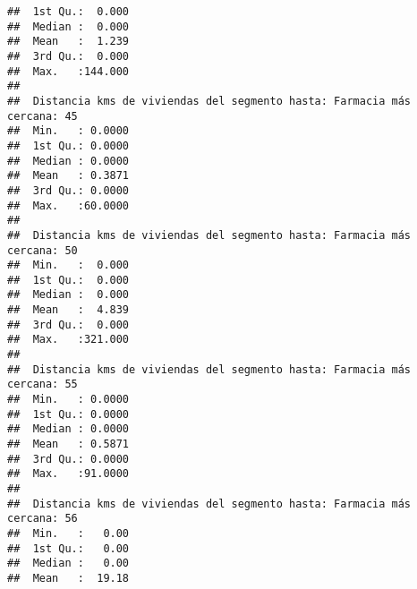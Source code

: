 \documentclass[11pt,]{article}
\begin{document}
\begin{verbatim}
##  1st Qu.:  0.000                                                        
##  Median :  0.000                                                        
##  Mean   :  1.239                                                        
##  3rd Qu.:  0.000                                                        
##  Max.   :144.000                                                        
##                                                                         
##  Distancia kms de viviendas del segmento hasta: Farmacia más cercana: 45
##  Min.   : 0.0000                                                        
##  1st Qu.: 0.0000                                                        
##  Median : 0.0000                                                        
##  Mean   : 0.3871                                                        
##  3rd Qu.: 0.0000                                                        
##  Max.   :60.0000                                                        
##                                                                         
##  Distancia kms de viviendas del segmento hasta: Farmacia más cercana: 50
##  Min.   :  0.000                                                        
##  1st Qu.:  0.000                                                        
##  Median :  0.000                                                        
##  Mean   :  4.839                                                        
##  3rd Qu.:  0.000                                                        
##  Max.   :321.000                                                        
##                                                                         
##  Distancia kms de viviendas del segmento hasta: Farmacia más cercana: 55
##  Min.   : 0.0000                                                        
##  1st Qu.: 0.0000                                                        
##  Median : 0.0000                                                        
##  Mean   : 0.5871                                                        
##  3rd Qu.: 0.0000                                                        
##  Max.   :91.0000                                                        
##                                                                         
##  Distancia kms de viviendas del segmento hasta: Farmacia más cercana: 56
##  Min.   :   0.00                                                        
##  1st Qu.:   0.00                                                        
##  Median :   0.00                                                        
##  Mean   :  19.18                                                        

\end{verbatim}
\end{document}
